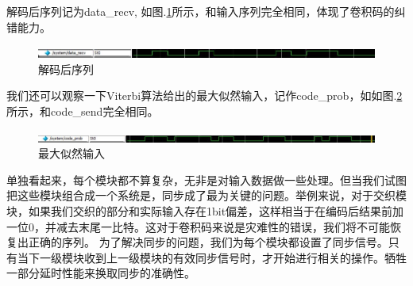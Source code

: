 
解码后序列记为data\_recv, 如图.\ref{fig:DataRecv}所示，和输入序列完全相同，体现了卷积码的纠错能力。
\begin{figure}[htb]
\centering
\includegraphics[width=1.2\textwidth]{images//DataRecv.jpg}
\caption{\label{fig:DataRecv}解码后序列}
\end{figure}
我们还可以观察一下Viterbi算法给出的最大似然输入，记作code\_prob，如如图.\ref{fig:CodeProb}所示，和code\_send完全相同。
\begin{figure}[htb]
\centering
\includegraphics[width=1.2\textwidth]{images//CodeProb.jpg}
\caption{\label{fig:CodeProb}最大似然输入}
\end{figure}

单独看起来，每个模块都不算复杂，无非是对输入数据做一些处理。但当我们试图把这些模块组合成一个系统是，同步成了最为关键的问题。举例来说，对于交织模块，如果我们交织的部分和实际输入存在1bit偏差，这样相当于在编码后结果前加一位0，并减去末尾一比特。这对于卷积码来说是灾难性的错误，我们将不可能恢复出正确的序列。
为了解决同步的问题，我们为每个模块都设置了同步信号。只有当下一级模块收到上一级模块的有效同步信号时，才开始进行相关的操作。牺牲一部分延时性能来换取同步的准确性。

